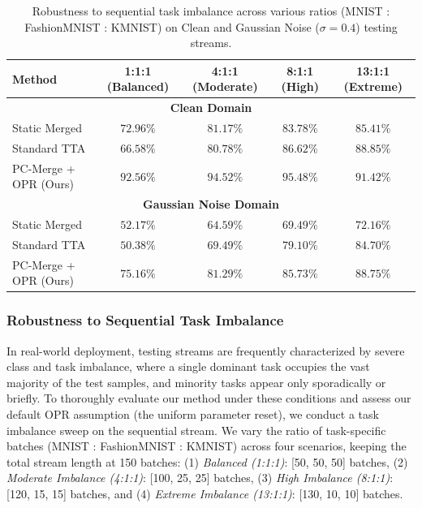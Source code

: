 \documentclass{article}
\theoremstyle{plain}
\theoremstyle{definition}
\theoremstyle{remark}
\begin{document}
\begin{table}[t]
\caption{Robustness to sequential task imbalance across various ratios (MNIST : FashionMNIST : KMNIST) on Clean and Gaussian Noise ($\sigma=0.4$) testing streams.}
\label{tab:imbalance_sweep}
\vskip 0.1in
\begin{center}
\begin{small}
\scshape
\begin{tabular}{lcccc}
\toprule
Method & 1:1:1 (Balanced) & 4:1:1 (Moderate) & 8:1:1 (High) & 13:1:1 (Extreme) \\
\midrule
\multicolumn{5}{c}{\textbf{Clean Domain}} \\
\midrule
Static Merged & $72.96\%$ & $81.17\%$ & $83.78\%$ & $85.41\%$ \\
Standard TTA & $66.58\%$ & $80.78\%$ & $86.62\%$ & $88.85\%$ \\
PC-Merge + OPR (Ours) & $\mathbf{92.56\%}$ & $\mathbf{94.52\%}$ & $\mathbf{95.48\%}$ & $\mathbf{91.42\%}$ \\
\midrule
\multicolumn{5}{c}{\textbf{Gaussian Noise Domain}} \\
\midrule
Static Merged & $52.17\%$ & $64.59\%$ & $69.49\%$ & $72.16\%$ \\
Standard TTA & $50.38\%$ & $69.49\%$ & $79.10\%$ & $84.70\%$ \\
PC-Merge + OPR (Ours) & $\mathbf{75.16\%}$ & $\mathbf{81.29\%}$ & $\mathbf{85.73\%}$ & $\mathbf{88.75\%}$ \\
\bottomrule
\end{tabular}
\end{small}
\end{center}
\vskip -0.1in
\end{table}

\subsubsection{Robustness to Sequential Task Imbalance}
In real-world deployment, testing streams are frequently characterized by severe class and task imbalance, where a single dominant task occupies the vast majority of the test samples, and minority tasks appear only sporadically or briefly. To thoroughly evaluate our method under these conditions and assess our default OPR assumption (the uniform parameter reset), we conduct a task imbalance sweep on the sequential stream. We vary the ratio of task-specific batches (MNIST : FashionMNIST : KMNIST) across four scenarios, keeping the total stream length at 150 batches: (1) \emph{Balanced (1:1:1)}: [50, 50, 50] batches, (2) \emph{Moderate Imbalance (4:1:1)}: [100, 25, 25] batches, (3) \emph{High Imbalance (8:1:1)}: [120, 15, 15] batches, and (4) \emph{Extreme Imbalance (13:1:1)}: [130, 10, 10] batches.
\end{document}
